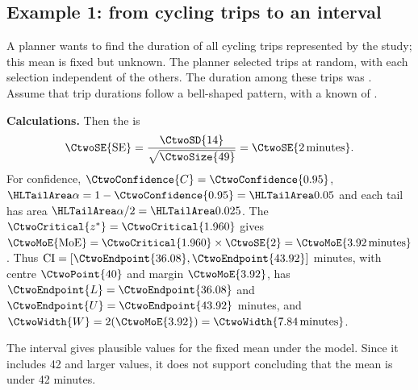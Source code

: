 \noindent\begin{minipage}{\linewidth}
\subsection{Example 1: from cycling trips to an interval}
\label{subsec:c2-cycling-example}
A planner wants to find the  duration of all cycling trips represented by the study; this mean is fixed but unknown. The planner selected  trips at random, with each selection independent of the others. The  duration among these trips was . Assume that trip durations follow a bell-shaped pattern, with a known  of .

\textbf{Calculations.} Then the  is
\[
\CtwoSE{\mathrm{SE}}=\frac{\CtwoSD{14}}{\sqrt{\CtwoSize{49}}}=\CtwoSE{2\,\text{minutes}}.
\]
For  confidence, $\CtwoConfidence{C}=\CtwoConfidence{0.95}$, $\CtwoSignificance{\alpha}=1-\CtwoConfidence{0.95}=\CtwoSignificance{0.05}$ and each tail has area $\CtwoSignificance{\alpha/2}=\CtwoSignificance{0.025}$. The  $\CtwoCritical{z^*}=\CtwoCritical{1.960}$ gives  $\CtwoMoE{\mathrm{MoE}}=\CtwoCritical{1.960}\times\CtwoSE{2}=\CtwoMoE{3.92\,\text{minutes}}$. Thus $\mathrm{CI}=[\CtwoEndpoint{36.08},\CtwoEndpoint{43.92}]$ minutes, with centre $\CtwoPoint{40}$ and margin $\CtwoMoE{3.92}$, has  $\CtwoEndpoint{L}=\CtwoEndpoint{36.08}$ and $\CtwoEndpoint{U}=\CtwoEndpoint{43.92}$ minutes, and  $\CtwoWidth{W}=2(\CtwoMoE{3.92})=\CtwoWidth{7.84\,\text{minutes}}$.

The interval gives plausible values for the fixed mean under the model. Since it includes 42 and larger values, it does not support concluding that the mean is under 42 minutes.
\par\vspace{3mm}
\end{minipage}\par

